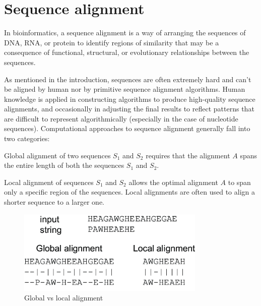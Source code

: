 \chapter{Sequence alignment}

\label{kap:sequence_alignment} %

In bioinformatics, a sequence alignment is a way of arranging the sequences of DNA, RNA, or protein
to identify regions of similarity that may be a consequence of functional, structural, or
evolutionary relationships between the sequences. \cite{Gollery2005BioinformaticsSA}

As mentioned in the introduction, sequences are often extremely hard and can't be aligned by human
nor by primitive sequence alignment algorithms. Human knowledge is applied in constructing
algorithms to produce high-quality sequence alignments, and occasionally in adjusting the final
results to reflect patterns that are difficult to represent algorithmically (especially in the case
of nucleotide sequences). Computational approaches to sequence alignment generally fall into two
categories: 

\begin{theorem}
  Global alignment of two sequences $S_{1}$ and $S_{2}$ requires that the alignment $A$ spans the
  entire length of both the sequences $S_{1}$ and $S_{2}$.
\end{theorem}

\begin{theorem}
  Local alignment of sequences $S_{1}$ and $S_{2}$ allows the optimal alignment $A$ to span only a
  specific region of the sequences. Local alignments are often used to align a shorter sequence to 
  a larger one.
\end{theorem}

\begin{figure}[H]
  \centerline{\includegraphics[width=0.8\textwidth]{images/local_global_alignment.png}}
  \caption[Global vs local alignment]{Global vs local alignment}
  \label{obr:local_global_alignment}
\end{figure}

